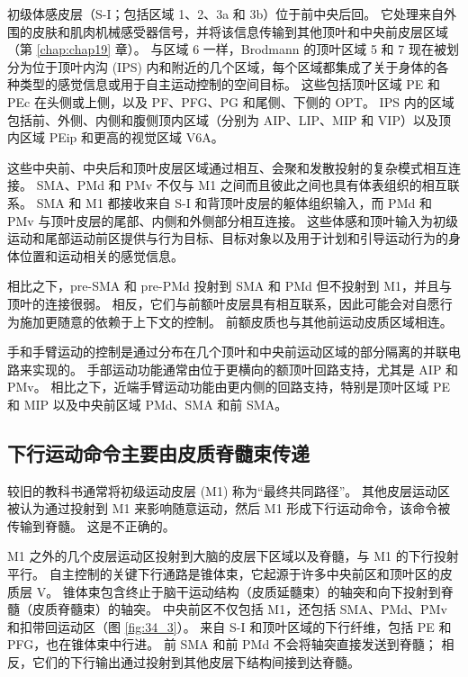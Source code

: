 初级体感皮层（S-I；包括区域 1、2、3a 和 3b）位于前中央后回。
它处理来自外围的皮肤和肌肉机械感受器信号，并将该信息传输到其他顶叶和中央前皮层区域（第 \ref{chap:chap19} 章）。
与区域 6 一样，Brodmann 的顶叶区域 5 和 7 现在被划分为位于顶叶内沟 (IPS) 内和附近的几个区域，每个区域都集成了关于身体的各种类型的感觉信息或用于自主运动控制的空间目标。
这些包括顶叶区域 PE 和 PEc 在头侧或上侧，以及 PF、PFG、PG 和尾侧、下侧的 OPT。 IPS 内的区域包括前、外侧、内侧和腹侧顶内区域（分别为 AIP、LIP、MIP 和 VIP）以及顶内区域 PEip 和更高的视觉区域 V6A。


这些中央前、中央后和顶叶皮层区域通过相互、会聚和发散投射的复杂模式相互连接。
SMA、PMd 和 PMv 不仅与 M1 之间而且彼此之间也具有体表组织的相互联系。
SMA 和 M1 都接收来自 S-I 和背顶叶皮层的躯体组织输入，而 PMd 和 PMv 与顶叶皮层的尾部、内侧和外侧部分相互连接。
这些体感和顶叶输入为初级运动和尾部运动前区提供与行为目标、目标对象以及用于计划和引导运动行为的身体位置和运动相关的感觉信息。


相比之下，pre-SMA 和 pre-PMd 投射到 SMA 和 PMd 但不投射到 M1，并且与顶叶的连接很弱。
相反，它们与前额叶皮层具有相互联系，因此可能会对自愿行为施加更随意的依赖于上下文的控制。
前额皮质也与其他前运动皮质区域相连。


手和手臂运动的控制是通过分布在几个顶叶和中央前运动区域的部分隔离的并联电路来实现的。
手部运动功能通常由位于更横向的额顶叶回路支持，尤其是 AIP 和 PMv。
相比之下，近端手臂运动功能由更内侧的回路支持，特别是顶叶区域 PE 和 MIP 以及中央前区域 PMd、SMA 和前 SMA。




\subsection{下行运动命令主要由皮质脊髓束传递}

较旧的教科书通常将初级运动皮层 (M1) 称为“最终共同路径”。
其他皮层运动区被认为通过投射到 M1 来影响随意运动，然后 M1 形成下行运动命令，该命令被传输到脊髓。 这是不正确的。


M1 之外的几个皮层运动区投射到大脑的皮层下区域以及脊髓，与 M1 的下行投射平行。 自主控制的关键下行通路是锥体束，它起源于许多中央前区和顶叶区的皮质层 V。
锥体束包含终止于脑干运动结构（皮质延髓束）的轴突和向下投射到脊髓（皮质脊髓束）的轴突。 
中央前区不仅包括 M1，还包括 SMA、PMd、PMv 和扣带回运动区（图 \ref{fig:34_3}）。
来自 S-I 和顶叶区域的下行纤维，包括 PE 和 PFG，也在锥体束中行进。 前 SMA 和前 PMd 不会将轴突直接发送到脊髓；
相反，它们的下行输出通过投射到其他皮层下结构间接到达脊髓。


